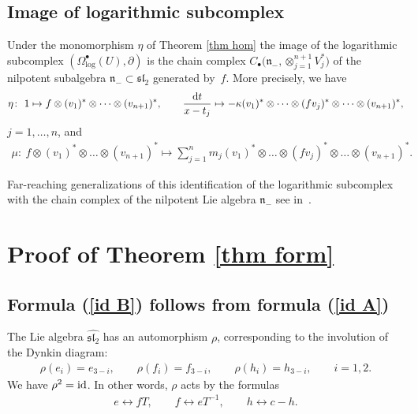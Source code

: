 \documentclass[pdftex]{sigma}
\numberwithin{equation}{section}
\begin{document}
\subsection{Image of logarithmic subcomplex}
Under the monomorphism $\eta$ of Theorem \ref{thm hom} the image of the logarithmic subcomplex $(\Omega^\bullet_{\log}(U), \partial)$ is the chain complex $C_{\bullet}\big({\mathfrak n}_-, \otimes_{j=1}^{n+1}V_j^*\big)$ of the nilpotent subalgebra ${\mathfrak n}_-\subset\mathfrak{sl}_2$ generated by~$f$. More precisely, we have
\begin{gather*}
\eta \colon \ 1\mapsto f\otimes (v_1)^*\otimes\dots\otimes(v_{n+1})^*, \qquad \frac{{\rm d}t}{x-t_j}\mapsto -\kappa(v_1)^*\otimes\dots\otimes (fv_j)^*\otimes\dots\otimes(v_{n+1})^*,
\end{gather*}
$j=1,\dots,n$, and
\begin{gather*}
\mu\colon \ f\otimes (v_1)^*\otimes\dots\otimes(v_{n+1})^* \mapsto \sum_{j=1}^n m_j (v_1)^*\otimes\dots\otimes(fv_j)^*\otimes\dots\otimes(v_{n+1})^*.
\end{gather*}

Far-reaching generalizations of this identification of the logarithmic subcomplex with the chain complex of the nilpotent Lie algebra ${\mathfrak n}_-$ see in~\cite{SV1}.

\section{Proof of Theorem \ref{thm form}}\label{sec PROOF}

\subsection{Formula (\ref{id B}) follows from formula (\ref{id A})}
The Lie algebra $\widehat{{\mathfrak{sl}_2}}$ has an automorphism $\rho$, corresponding to the involution of the Dynkin diagram:
\begin{gather*}
\rho(e_{i})=e_{3-i}, \qquad \rho(f_{i})=f_{3-i}, \qquad \rho(h_{i})=h_{3-i}, \qquad i=1,2.
\end{gather*}
We have $\rho^2={\rm id}$. In other words, $\rho$ acts by the formulas
\begin{gather*}
e\leftrightarrow fT, \qquad f \leftrightarrow e T^{-1}, \qquad h \leftrightarrow c-h.
\end{gather*}
\end{document}

